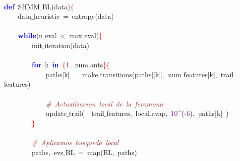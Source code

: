 \noindent
\mbox{} \\
\mbox{}\textbf{\textcolor{Blue}{def}}\ SHMM$\_$BL\textcolor{BrickRed}{(}data\textcolor{BrickRed}{)}\textcolor{Red}{\{} \\
\mbox{}\ \ \ \ data$\_$heuristic\ \textcolor{BrickRed}{=}\ entropy\textcolor{BrickRed}{(}data\textcolor{BrickRed}{)} \\
\mbox{} \\
\mbox{}\ \ \ \ \textbf{\textcolor{Blue}{while}}\textcolor{BrickRed}{(}n$\_$eval\ \textcolor{BrickRed}{\textless{}}\ max$\_$eval\textcolor{BrickRed}{)}\textcolor{Red}{\{} \\
\mbox{}\ \ \ \ \ \ \ \ init$\_$iteration\textcolor{BrickRed}{(}data\textcolor{BrickRed}{)} \\
\mbox{} \\
\mbox{}\ \ \ \ \ \ \ \ \textbf{\textcolor{Blue}{for}}\ k\ \textbf{\textcolor{Blue}{in}}\ \textcolor{Red}{\{}\textcolor{Purple}{1}\textcolor{BrickRed}{...}num\textcolor{BrickRed}{.}ants\textcolor{Red}{\}\{} \\
\mbox{}\ \ \ \ \ \ \ \ \ \ \ \ paths\textcolor{BrickRed}{[}k\textcolor{BrickRed}{]}\ \textcolor{BrickRed}{=}\ make\textcolor{BrickRed}{.}transitions\textcolor{BrickRed}{(}paths\textcolor{BrickRed}{[[}k\textcolor{BrickRed}{]],}\ num$\_$features\textcolor{BrickRed}{[}k\textcolor{BrickRed}{],}\ trail$\_$features\textcolor{BrickRed}{)} \\
\mbox{} \\
\mbox{}\ \ \ \ \ \ \ \ \ \ \ \ \textit{\textcolor{Brown}{\#\ Actualizacion\ local\ de\ la\ feromona}} \\
\mbox{}\ \ \ \ \ \ \ \ \ \ \ \ update$\_$trail\textcolor{BrickRed}{(}\ \ trail$\_$features\textcolor{BrickRed}{,}\ local\textcolor{BrickRed}{.}evap\textcolor{BrickRed}{,}\ \textcolor{Purple}{10}\textcolor{BrickRed}{\textasciicircum{}(-}\textcolor{Purple}{6}\textcolor{BrickRed}{),}\ paths\textcolor{BrickRed}{[}k\textcolor{BrickRed}{]}\ \textcolor{BrickRed}{)} \\
\mbox{}\ \ \ \ \ \ \ \ \textcolor{Red}{\}} \\
\mbox{} \\
\mbox{}\ \ \ \ \ \ \ \ \textit{\textcolor{Brown}{\#\ Aplicamos\ busqueda\ local}} \\
\mbox{}\ \ \ \ \ \ \ \ paths\textcolor{BrickRed}{,}\ evs$\_$BL\ \textcolor{BrickRed}{=}\ map\textcolor{BrickRed}{(}BL\textcolor{BrickRed}{,}\ paths\textcolor{BrickRed}{)} \\
